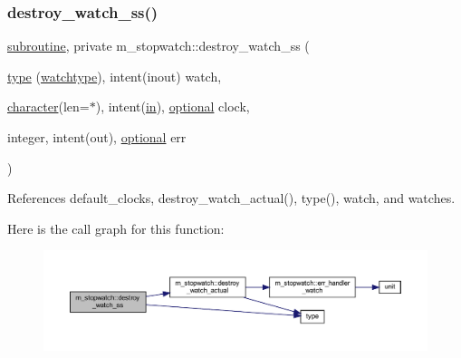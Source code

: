 \subsubsection{\texorpdfstring{destroy\+\_\+watch\+\_\+ss()}{destroy\_watch\_ss()}}
{\footnotesize\ttfamily \hyperlink{M__stopwatch_83_8txt_acfbcff50169d691ff02d4a123ed70482}{subroutine}, private m\+\_\+stopwatch\+::destroy\+\_\+watch\+\_\+ss (\begin{DoxyParamCaption}\item[{\hyperlink{stop__watch_83_8txt_a70f0ead91c32e25323c03265aa302c1c}{type} (\hyperlink{structm__stopwatch_1_1watchtype}{watchtype}), intent(inout)}]{watch,  }\item[{\hyperlink{option__stopwatch_83_8txt_abd4b21fbbd175834027b5224bfe97e66}{character}(len=$\ast$), intent(\hyperlink{M__journal_83_8txt_afce72651d1eed785a2132bee863b2f38}{in}), \hyperlink{option__stopwatch_83_8txt_aa4ece75e7acf58a4843f70fe18c3ade5}{optional}}]{clock,  }\item[{integer, intent(out), \hyperlink{option__stopwatch_83_8txt_aa4ece75e7acf58a4843f70fe18c3ade5}{optional}}]{err }\end{DoxyParamCaption})\hspace{0.3cm}{\ttfamily [private]}}



References default\+\_\+clocks, destroy\+\_\+watch\+\_\+actual(), type(), watch, and watches.

Here is the call graph for this function\+:
\nopagebreak
\begin{figure}[H]
\begin{center}
\leavevmode
\includegraphics[width=350pt]{namespacem__stopwatch_a52d004e036a839d4513629cc4cb158c7_cgraph}
\end{center}
\end{figure}
\mbox{\label{namespacem__stopwatch_a5441e214dd82a2356ed4f4fe892cbb51}} 
